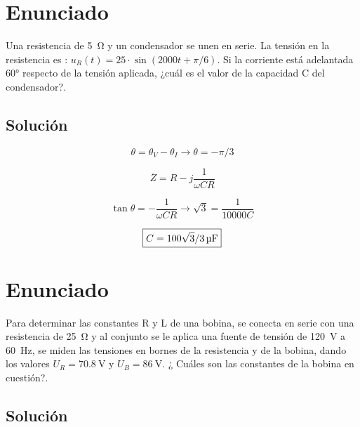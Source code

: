 \section{Enunciado}

Una resistencia de \qty{5}{\ohm} y un condensador se unen en serie. La tensión en la resistencia es : $u_R(t) = 25 \cdot \sin(2000t + \pi/6)$. Si la corriente está adelantada \ang{60} respecto de la tensión aplicada, ¿cuál es el valor de la capacidad C del condensador?.

\subsection*{Solución}


\begin{equation*}
    \theta = \theta_V - \theta_I \rightarrow \theta = -\pi/3
\end{equation*}

\begin{equation*}
    \overline{Z} = R - j \frac{1}{\omega C R}
  \end{equation*}
  
\begin{equation*}
  \tan \theta = - \frac{1}{\omega C R} \rightarrow \sqrt{3} = \frac{1}{10000 C}
\end{equation*}

\begin{equation*}
  \boxed{C = \SI[parse-numbers = false]{100\sqrt{3}/3}{\micro\farad}}
\end{equation*}

\section{Enunciado}
Para determinar las constantes R y L de una bobina, se conecta en serie con una resistencia de \qty{25}{\ohm} y al conjunto se le aplica una fuente de tensión de \qty{120}{\volt} a \qty{60}{\hertz}, se miden las tensiones en bornes de la resistencia y de la bobina, dando los valores $U_R = \qty{70.8}{\volt}$ y $U_B = \qty{86}{\volt}$. ¿ Cuáles son las constantes de la bobina en cuestión?.

\subsection*{Solución}

